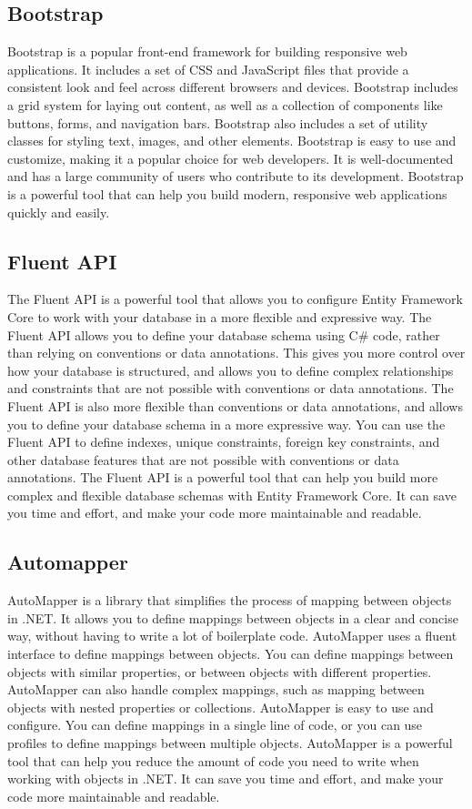 \subsection{Bootstrap}
Bootstrap is a popular front-end framework for building responsive web applications. It includes a set of CSS and JavaScript files that provide a consistent look and feel across different browsers and devices. 
Bootstrap includes a grid system for laying out content, as well as a collection of components like buttons, forms, and navigation bars. Bootstrap also includes a set of utility classes for styling text, images, and other elements. 
Bootstrap is easy to use and customize, making it a popular choice for web developers. It is well-documented and has a large community of users who contribute to its development. 
Bootstrap is a powerful tool that can help you build modern, responsive web applications quickly and easily.

\subsection{Fluent API}
The Fluent API is a powerful tool that allows you to configure Entity Framework Core to work with your database in a more flexible and expressive way.
The Fluent API allows you to define your database schema using C\# code, rather than relying on conventions or data annotations. This gives you more control over how your database is structured, and allows you to define complex relationships and constraints that are not possible with conventions or data annotations.
The Fluent API is also more flexible than conventions or data annotations, and allows you to define your database schema in a more expressive way. You can use the Fluent API to define indexes, unique constraints, foreign key constraints, and other database features that are not possible with conventions or data annotations.
The Fluent API is a powerful tool that can help you build more complex and flexible database schemas with Entity Framework Core. It can save you time and effort, and make your code more maintainable and readable.

\subsection{Automapper}
AutoMapper is a library that simplifies the process of mapping between objects in .NET. It allows you to define mappings between objects in a clear and concise way, without having to write a lot of boilerplate code.
AutoMapper uses a fluent interface to define mappings between objects. You can define mappings between objects with similar properties, or between objects with different properties. 
AutoMapper can also handle complex mappings, such as mapping between objects with nested properties or collections.
AutoMapper is easy to use and configure. You can define mappings in a single line of code, or you can use profiles to define mappings between multiple objects.
AutoMapper is a powerful tool that can help you reduce the amount of code you need to write when working with objects in .NET. It can save you time and effort, and make your code more maintainable and readable.

